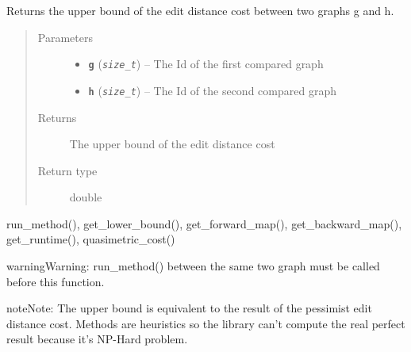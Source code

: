 \documentclass[letterpaper,10pt,english]{sphinxmanual}
\begin{document}
\begin{fulllineitems}
\label{doc:gedlibpy.get_upper_bound}
Returns the upper bound of the edit distance cost between two graphs g and h.
\begin{quote}\begin{description}
\item[{Parameters}] \leavevmode\begin{itemize}
\item {} 
\textbf{\texttt{g}} (\emph{\texttt{size\_t}}) -- The Id of the first compared graph

\item {} 
\textbf{\texttt{h}} (\emph{\texttt{size\_t}}) -- The Id of the second compared graph

\end{itemize}

\item[{Returns}] \leavevmode
The upper bound of the edit distance cost

\item[{Return type}] \leavevmode
double

\end{description}\end{quote}




run\_method(), get\_lower\_bound(),  get\_forward\_map(), get\_backward\_map(), get\_runtime(), quasimetric\_cost()



\begin{notice}{warning}{Warning:}
run\_method() between the same two graph must be called before this function.
\end{notice}

\begin{notice}{note}{Note:}
The upper bound is equivalent to the result of the pessimist edit distance cost. Methods are heuristics so the library can't compute the real perfect result because it's NP-Hard problem.
\end{notice}

\end{fulllineitems}

\end{document}
